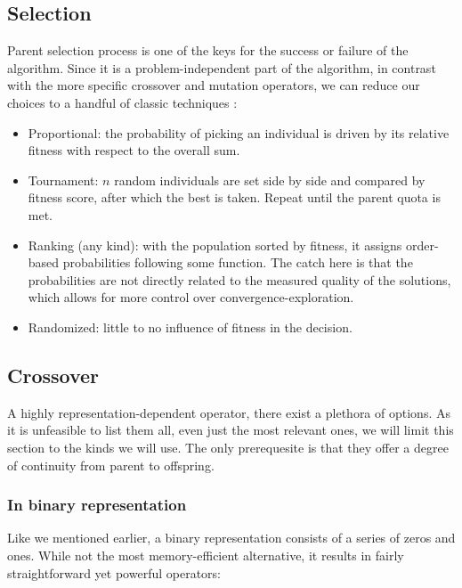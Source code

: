 	\subsection{Selection}

		Parent selection process is one of the keys for the success or failure of the algorithm. Since it is a problem-independent part of the algorithm, in contrast with the more specific crossover and mutation operators, we can reduce our choices to a handful of classic techniques \cite{selection-ga}:

		\begin{itemize}

			\item
			Proportional: the probability of picking an individual is driven by its relative fitness with respect to the overall sum.

			\item
			Tournament: $n$ random individuals are set side by side and compared by fitness score, after which the best is taken. Repeat until the parent quota is met.

			\item
			Ranking (any kind): with the population sorted by fitness, it assigns order-based probabilities following some function. The catch here is that the probabilities are not directly related to the measured quality of the solutions, which allows for more control over convergence-exploration.

			\item
			Randomized: little to no influence of fitness in the decision.

		\end{itemize}

	\subsection{Crossover}

		A highly representation-dependent operator, there exist a plethora of options. As it is unfeasible to list them all, even just the most relevant ones, we will limit this section to the kinds we will use. The only prerequesite is that they offer a degree of continuity from parent to offspring.

		\subsubsection{In binary representation}

			Like we mentioned earlier, a binary representation consists of a series of zeros and ones. While not the most memory-efficient alternative, it results in fairly straightforward yet powerful operators:

